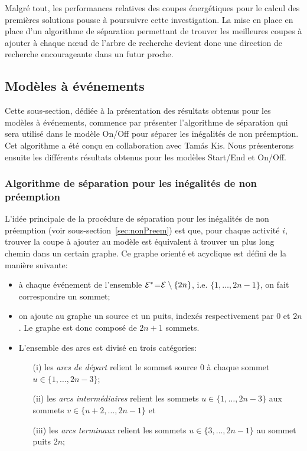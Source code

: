Malgré tout, les performances relatives des coupes énergétiques pour
le calcul des premières solutions pousse à poursuivre cette
investigation. La mise en place en place d'un algorithme de séparation
permettant de trouver les meilleures coupes à ajouter à chaque n\oe ud
de l'arbre de recherche devient donc une direction de recherche
encourageante dans un futur proche. 

\subsection{Modèles à événements}

Cette sous-section, dédiée à la présentation des résultats obtenus pour les
modèles à événements, commence par présenter l'algorithme de
séparation qui sera utilisé dans le modèle On/Off pour séparer les
inégalités de non préemption. Cet algorithme a été conçu en
collaboration avec Tam{\'a}s Kis. Nous présenterons ensuite les
différents résultats obtenus pour les modèles Start/End et On/Off.

\subsubsection{Algorithme de séparation pour les inégalités de non
  préemption} 

L'idée principale de la procédure de séparation pour les inégalités de
non préemption (voir sous-section~\ref{sec:nonPreem}) est que, pour
chaque activité $i$, trouver la coupe à ajouter au modèle est
équivalent à trouver un plus long chemin dans un certain graphe. Ce
graphe orienté et acyclique est défini de la manière suivante:
\begin{itemize}
\item à chaque événement de l'ensemble ${\cal E}^*$=${\cal E} \setminus\{2n\}$,
i.e. $\{1,\dots,2n-1\}$, on fait correspondre un sommet;
\item on ajoute au graphe un source et un puits, indexés
respectivement par $0$ et $2n$. Le graphe est donc composé de $2n+1$
sommets.
\item L'ensemble des arcs est divisé en trois catégories:
  \begin{itemize}
  \item[(i)] les {\it arcs de départ} relient le sommet source $0$ à
chaque sommet $u \in \{1,\dots,2n-3\}$;
  \item[(ii)] les {\it arcs intermédiaires} relient les sommets $u \in
\{1,\dots, 2n-3\}$ aux sommets $v \in \{u+2,\dots,2n-1\}$ et
  \item[(iii)] les {\it arcs terminaux} relient les sommets $u \in
\{3,\dots,2n-1\}$ au sommet puits $2n$;
  \end{itemize}
\end{itemize}

